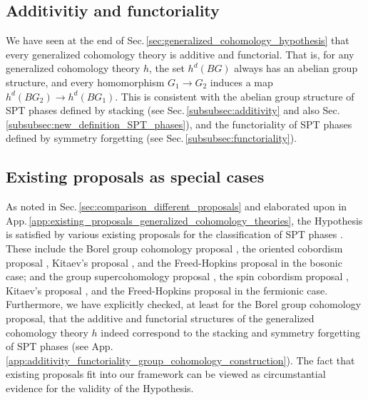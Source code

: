 \documentclass[sort&compress]{elsarticle}
\theoremstyle{theoremstyle}
\theoremstyle{framedtheoremstyle}
\theoremstyle{definitionstyle}
\theoremstyle{definitionstyle}
\theoremstyle{definitionstyle}
\theoremstyle{definitionstyle}
\theoremstyle{nameddefinitionstyle}
\theoremstyle{framednameddefinitionstyle}
\theoremstyle{proofstyle}
\theoremstyle{definitionstyle}
\newcommand{\fromto}{\rightarrow}
\begin{document}
\subsection{Additivitiy and functoriality\label{subsec:additivity_functoriality}}

We have seen at the end of Sec.\,\ref{sec:generalized_cohomology_hypothesis} that every generalized cohomology theory is additive and functorial. That is, for any generalized cohomology theory $h$, the set $h^d(BG)$ always has an abelian group structure, and every homomorphism $G_1 \fromto G_2$ induces a map $h^d(BG_2) \fromto h^d(BG_1)$. This is consistent with the abelian group structure of SPT phases defined by stacking (see Sec.\,\ref{subsubsec:additivity} and also Sec.\,\ref{subsubsec:new_definition_SPT_phases}), and the functoriality of SPT phases defined by symmetry forgetting (see Sec.\,\ref{subsubsec:functoriality}).







\subsection{Existing proposals as special cases\label{subsec:existing_proposals_special_cases}}

As noted in Sec.\,\ref{sec:comparison_different_proposals} and elaborated upon in App.\,\ref{app:existing_proposals_generalized_cohomology_theories}, the Hypothesis is satisfied by various existing proposals for the classification of SPT phases \cite{Kitaev_Stony_Brook_2011_SRE_1, Kitaev_Stony_Brook_2013_SRE, Kitaev_IPAM}. These include the Borel group cohomology proposal \cite{Wen_Boson}, the oriented cobordism proposal \cite{Kapustin_Boson}, Kitaev's proposal \cite{Kitaev_Stony_Brook_2011_SRE_1, Kitaev_Stony_Brook_2013_SRE}, and the Freed-Hopkins proposal \cite{Freed_SRE_iTQFT, Freed_ReflectionPositivity} in the bosonic case; and the group supercohomology proposal \cite{Wen_Fermion}, the spin cobordism proposal \cite{Kapustin_Fermion}, Kitaev's proposal \cite{Kitaev_Stony_Brook_2013_SRE, Kitaev_IPAM}, and the Freed-Hopkins proposal \cite{Freed_SRE_iTQFT, Freed_ReflectionPositivity} in the fermionic case.
Furthermore, we have explicitly checked, at least for the Borel group cohomology proposal, that the additive and functorial structures of the generalized cohomology theory $h$ indeed correspond to the stacking and symmetry forgetting of SPT phases (see App.\,\ref{app:additivity_functoriality_group_cohomology_construction}). The fact that existing proposals fit into our framework can be viewed as circumstantial evidence for the validity of the Hypothesis.
\end{document}
